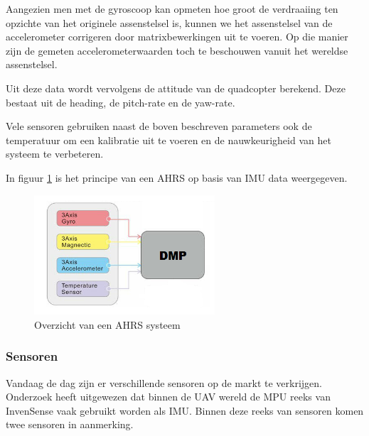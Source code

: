 			\par Aangezien men met de gyroscoop kan opmeten hoe groot de verdraaiing ten opzichte van het originele assenstelsel is, kunnen we het assenstelsel van de accelerometer corrigeren door matrixbewerkingen uit te voeren. Op die manier zijn de gemeten accelerometerwaarden toch te beschouwen vanuit het wereldse assenstelsel.

			\par Uit deze data wordt vervolgens de attitude van de quadcopter berekend. Deze bestaat uit de heading, de pitch-rate en de yaw-rate. 

			\par Vele sensoren gebruiken naast de boven beschreven parameters ook de temperatuur om een kalibratie uit te voeren en de nauwkeurigheid van het systeem te verbeteren.

			\par In figuur \ref{ahrs} is het principe van een AHRS op basis van IMU data weergegeven. 
			
			\begin{figure}[H]					  
				  \centering
				  \includegraphics[width=0.6\textwidth]{Vooronderzoek/ahrs.png}
				  \caption{Overzicht van een AHRS systeem}
				  \label{ahrs}
			\end{figure}


			\subsubsection{Sensoren}

				\par Vandaag de dag zijn er verschillende sensoren op de markt te verkrijgen. Onderzoek heeft uitgewezen dat binnen de UAV wereld de MPU reeks van InvenSense vaak gebruikt worden als IMU. Binnen deze reeks van sensoren komen twee sensoren in aanmerking.

